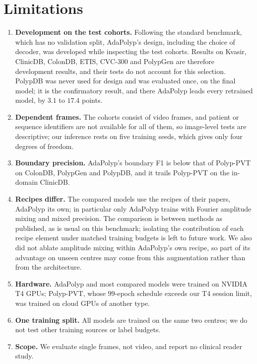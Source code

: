 \documentclass{ieeeaccess}
\begin{document}
\section{Limitations}
\label{sec:limits}
\begin{enumerate}
  \item \textbf{Development on the test cohorts.} Following the standard benchmark, which has no validation split, AdaPolyp's design, including the choice of decoder, was developed while inspecting the test cohorts. Results on Kvasir, ClinicDB, ColonDB, ETIS, CVC-300 and PolypGen are therefore development results, and their tests do not account for this selection. PolypDB was never used for design and was evaluated once, on the final model; it is the confirmatory result, and there AdaPolyp leads every retrained model, by $3.1$ to $17.4$ points.
  \item \textbf{Dependent frames.} The cohorts consist of video frames, and patient or sequence identifiers are not available for all of them, so image-level tests are descriptive; our inference rests on five training seeds, which gives only four degrees of freedom.
  \item \textbf{Boundary precision.} AdaPolyp's boundary F1 is below that of Polyp-PVT on ColonDB, PolypGen and PolypDB, and it trails Polyp-PVT on the in-domain ClinicDB.
  \item \textbf{Recipes differ.} The compared models use the recipes of their papers, AdaPolyp its own; in particular only AdaPolyp trains with Fourier amplitude mixing and mixed precision. The comparison is between methods as published, as is usual on this benchmark; isolating the contribution of each recipe element under matched training budgets is left to future work. We also did not ablate amplitude mixing within AdaPolyp's own recipe, so part of its advantage on unseen centres may come from this augmentation rather than from the architecture.
  \item \textbf{Hardware.} AdaPolyp and most compared models were trained on NVIDIA T4 GPUs; Polyp-PVT, whose $99$-epoch schedule exceeds our T4 session limit, was trained on cloud GPUs of another type.
  \item \textbf{One training split.} All models are trained on the same two centres; we do not test other training sources or label budgets.
  \item \textbf{Scope.} We evaluate single frames, not video, and report no clinical reader study.
\end{enumerate}
\end{document}
